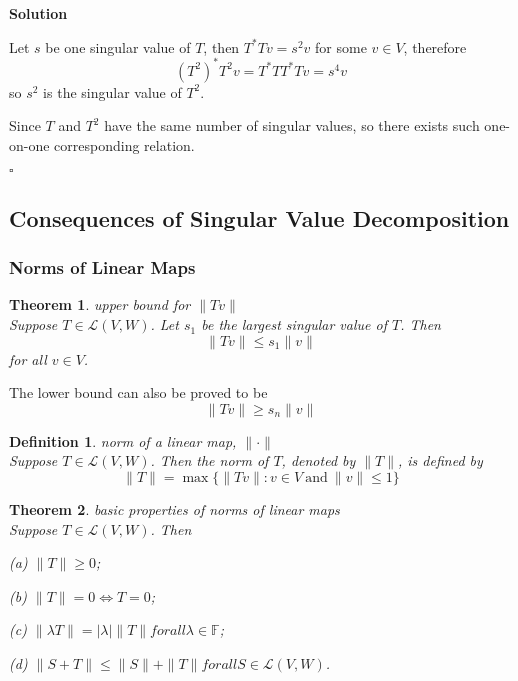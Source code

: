 \documentclass{article}
\newtheorem{theorem}{Theorem}[subsection]
\newtheorem{definition}{Definition}[subsection]
\newenvironment{solution}{%
{
    \textbf{Solution\\}
    }
}{
  \hfill $\square$ 
  \par\bigskip 
}
\newcommand{\FF}{\mathbb{F}}
\begin{document}
\begin{CJK}{UTF8}{gkai}
\begin{solution}
    Let $s$ be one singular value of $T$, then $T^\ast T v = s^2 v$ for some $v \in V$, therefore
    \[(T^2)^\ast T^2 v = T^\ast T T^\ast T v = s^4 v\]
    so $s^2$ is the singular value of $T^2$.
    
    Since $T$ and $T^2$ have the same number of singular values, so there exists such one-on-one corresponding relation.
\end{solution}

\subsection{Consequences of Singular Value Decomposition}

\subsubsection{Norms of Linear Maps}

\begin{theorem}
    upper bound for $\|Tv\|$\\

    Suppose $T \in \mathcal{L}(V,W)$. Let $s_1$ be the largest singular value of $T$. Then
    \[\|Tv\| \leq s_1\|v\|\]
    for all $v \in V$.
\end{theorem}
The lower bound can also be proved to be 
\[ \|Tv\| \geq s_n\|v\|\]

\begin{definition}
    norm of a linear map, $\|\cdot\|$\\
    
    Suppose $T \in \mathcal{L}(V,W)$. Then the norm of $T$, denoted by $\|T\|$, is defined by
    \[\|T\| = \max\{\|Tv\| : v \in V ~\text{and}~ \|v\| \leq 1\}   \]
\end{definition}

\begin{theorem}
    basic properties of norms of linear maps\\

    Suppose $T \in \mathcal{L}(V,W)$. Then

    (a) $\|T\| \geq 0$;

    (b) $\|T\| = 0 \Leftrightarrow T =0$;

    (c) $\|\lambda T\| = |\lambda|\|T\| for all \lambda \in \FF$;

    (d) $\|S +T\| \leq \|S\|+\|T\| for all S \in \mathcal{L}(V,W)$.
\end{theorem}


\end{CJK}
\end{document}
